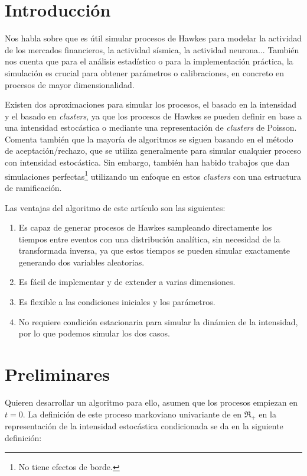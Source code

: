 \documentclass[a4paper,11pt]{book}
\begin{document}
\section{Introducción}
Nos habla sobre que es útil simular procesos de Hawkes para modelar la actividad de los mercados financieros, la actividad sísmica, la actividad neurona... 
También nos cuenta que para el análisis estadístico o para la implementación práctica, la simulación es crucial para obtener parámetros o calibraciones, 
en concreto en procesos de mayor dimensionalidad. 

Existen dos aproximaciones para simular los procesos, el basado en la intensidad y el basado en \textit{clusters}, ya que los procesos de Hawkes se pueden 
definir en base a una intensidad estocástica o mediante una representación de \textit{clusters} de Poisson. Comenta también que la mayoría de algoritmos 
se siguen basando en el método de aceptación/rechazo, que se utiliza generalmente para simular cualquier proceso con intensidad estocástica. Sin embargo, 
también han habido trabajos que dan simulaciones perfectas\footnote{No tiene efectos de borde.} 
utilizando un enfoque en estos \textit{clusters} con una estructura de ramificación.

Las ventajas del algoritmo de este artículo son las siguientes:
\begin{enumerate}
    \item Es capaz de generar procesos de Hawkes sampleando directamente los tiempos entre eventos con una distribución analítica, sin necesidad de 
    la transformada inversa, ya que estos tiempos se pueden simular exactamente generando dos variables aleatorias.
    \item Es fácil de implementar y de extender a varias dimensiones.
    \item Es flexible a las condiciones iniciales y los parámetros.
    \item No requiere condición estacionaria para simular la dinámica de la intensidad, por lo que podemos simular los dos casos.
\end{enumerate}

\section{Preliminares}

Quieren desarrollar un algoritmo para ello, asumen que los procesos empiezan en $t=0$. La definición de este proceso markoviano univariante de en 
$\Re_{+}$ en la representación de la intensidad estocástica condicionada se da en la siguiente definición:
\end{document}
